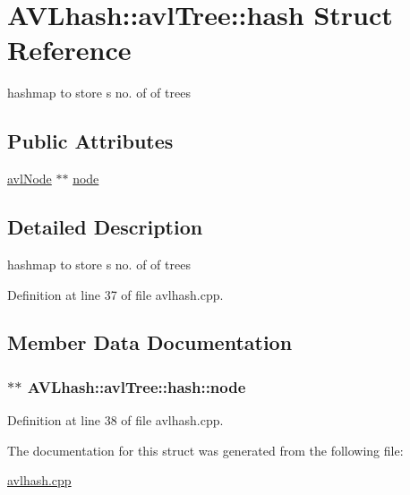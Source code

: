 \hypertarget{struct_a_v_lhash_1_1avl_tree_1_1hash}{\section{A\-V\-Lhash\-:\-:avl\-Tree\-:\-:hash Struct Reference}
\label{struct_a_v_lhash_1_1avl_tree_1_1hash}
}


hashmap to store s no. of of trees  


\subsection*{Public Attributes}
\begin{DoxyCompactItemize}
\item 
\hyperlink{namespace_a_v_lhash_a09cd9142193c004fe02c59c9dbc29732}{avl\-Node} $\ast$$\ast$ \hyperlink{struct_a_v_lhash_1_1avl_tree_1_1hash_ab5ef72ba42f496a46cb7bc5184038eb1}{node}
\end{DoxyCompactItemize}


\subsection{Detailed Description}
hashmap to store s no. of of trees 

Definition at line 37 of file avlhash.\-cpp.



\subsection{Member Data Documentation}
\hypertarget{struct_a_v_lhash_1_1avl_tree_1_1hash_ab5ef72ba42f496a46cb7bc5184038eb1}{
\subsubsection[{node}]{$\ast$$\ast$ A\-V\-Lhash\-::avl\-Tree\-::hash\-::node}}\label{struct_a_v_lhash_1_1avl_tree_1_1hash_ab5ef72ba42f496a46cb7bc5184038eb1}


Definition at line 38 of file avlhash.\-cpp.



The documentation for this struct was generated from the following file\-:\begin{DoxyCompactItemize}
\item 
\hyperlink{avlhash_8cpp}{avlhash.\-cpp}\end{DoxyCompactItemize}
